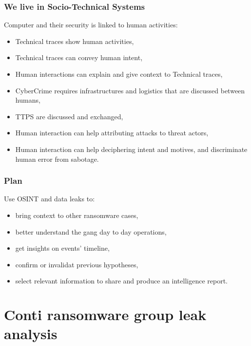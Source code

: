 \begin{frame}
    \frametitle{We live in Socio-Technical Systems}
    Computer and their security is linked to human activities:

    \begin{itemize}
        \item Technical traces show human activities,
        \item Technical traces can convey human intent,
        \item Human interactions can explain and give context to Technical traces,
        \item CyberCrime requires infrastructures and logistics that are discussed between humans,
        \item TTPS are discussed and exchanged,
        \item Human interaction can help attributing attacks to threat actors,
        \item Human interaction can help deciphering intent and motives, and discriminate human error from sabotage.
    \end{itemize}
\end{frame}


\begin{frame}
    \frametitle{Plan}
        Use OSINT and data leaks to:
    \begin{itemize}
        \item bring context to other ransomware cases,
        \item better understand the gang day to day operations,
        \item get insights on events' timeline,
        \item confirm or invalidat previous hypotheses,
        \item select relevant information to share and produce an intelligence report.
    \end{itemize}

\end{frame}

\section{Conti ransomware group leak analysis}

